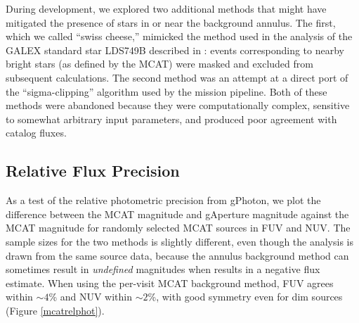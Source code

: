 \documentclass[trackchanges,preprint2]{aastex}
\begin{document}
 During development, we explored two additional methods that might have mitigated the presence of stars in or near the background annulus. The first, which we called ``swiss cheese,'' mimicked the method used in the analysis of the GALEX standard star LDS749B described in \citep{mor2007}: events corresponding to nearby bright stars (as defined by the MCAT) were masked and excluded from subsequent calculations. The second method was an attempt at a direct port of the ``sigma-clipping'' algorithm used by the mission pipeline. Both of these methods were abandoned because they were computationally complex, sensitive to somewhat arbitrary input parameters, and produced poor agreement with catalog fluxes. 

\subsection{Relative Flux Precision}
\label{relflux}
As a test of the relative photometric precision from gPhoton, we plot the difference between the MCAT magnitude and gAperture magnitude against the MCAT magnitude for randomly selected MCAT sources in FUV and NUV. The sample sizes for the two methods is slightly different, even though the analysis is drawn from the same source data, because the annulus background method can sometimes result in \emph{undefined} magnitudes when  results in a negative  flux estimate.  When using the per-visit MCAT background method, FUV agrees within $\sim 4$\% and NUV within $\sim 2$\%, with good symmetry even for dim sources (Figure \ref{mcatrelphot}).
\end{document}
